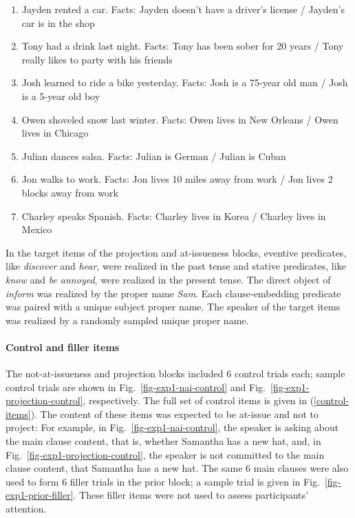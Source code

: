 \documentclass[11pt,fleqn]{article}
\newcommand{\6}{\mbox{$[\hspace*{-.6mm}[$}}
\newcommand{\9}{\mbox{$]\hspace*{-.6mm}]$}}
\begin{document}
\begin{enumerate}[leftmargin=4ex,itemsep=-2pt]
\item Jayden rented a car. Facts: Jayden doesn't have a driver's license / Jayden's car is in the shop
\item Tony had a drink last night. Facts: Tony has been sober for 20 years / Tony really likes to party with his friends
\item Josh learned to ride a bike yesterday. Facts: Josh is a 75-year old man / Josh is a 5-year old boy
\item Owen shoveled snow last winter. Facts: Owen lives in New Orleans / Owen lives in Chicago
\item Julian dances salsa. Facts: Julian is German / Julian is Cuban
\item Jon walks to work. Facts: Jon lives 10 miles away from work / Jon lives 2 blocks away from work
\item Charley speaks Spanish. Facts: Charley lives in Korea / Charley lives in Mexico
\end{enumerate}

In the target items of the projection and at-issueness blocks, eventive predicates, like {\em discover} and {\em hear}, were realized in the past tense and stative predicates, like {\em know} and {\em be annoyed}, were realized in the present tense. The direct object of {\em inform} was realized by the proper name {\em Sam}. Each clause-embedding predicate was paired with a unique subject proper name. The speaker of the target items was realized by a randomly sampled unique proper name. 

\paragraph{Control and filler items} The not-at-issueness and projection blocks included 6 control trials each; sample control trials are shown in Fig.~\ref{fig-exp1-nai-control} and Fig.~\ref{fig-exp1-projection-control}, respectively. The full set of control items is given in (\ref{control-items}). The content of these items was expected to be at-issue and not to project: For example,  in Fig.~\ref{fig-exp1-nai-control}, the speaker is asking about the main clause content, that is, whether Samantha has a new hat, and, in Fig.~\ref{fig-exp1-projection-control}, the speaker is not committed to the main clause content, that Samantha has a new hat. The same 6 main clauses were also used to form 6 filler trials in the prior block; a sample trial is given in Fig.~\ref{fig-exp1-prior-filler}. These filler items were not used to assess participants' attention. 
\end{document}
